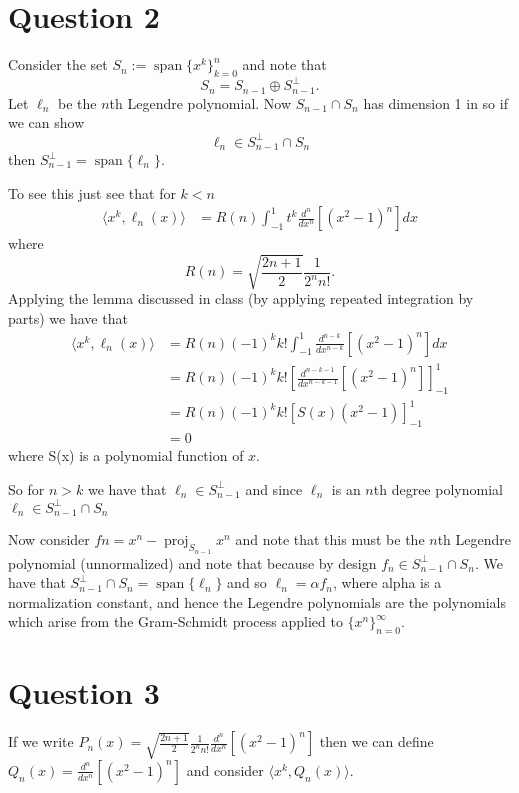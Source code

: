 \documentclass{unswmaths}
\begin{document}
\section*{Question 2}
Consider the set $ S_n := \operatorname{span} \{x^k\}^n_{k=0} $ and note that
$$ S_n = S_{n-1} \oplus S^\perp_{n-1}. $$ Let $ \ell_n $ be the $ n$th Legendre polynomial. 
Now $ S_{n-1} \cap S_n $ has dimension 1 in so if we can show 
$$ \ell_n \in S_{n-1}^\perp \cap S_n $$ 
then $ S_{n-1}^\perp = \operatorname{span} \{ \ell_n \} $.

To see this just see that for $ k < n $
\begin{align*}
	\langle x^k, \ell_n(x) \rangle 
		&= R(n) \int_{-1}^1 t^k \frac{d^n}{dx^n} \left[ (x^2 - 1)^n \right] dx
\end{align*}
where 
$$
	R(n) = \sqrt{\frac{2n+1}{2}}\frac{1}{2^n n!}. 
$$
Applying the lemma discussed in class (by applying repeated integration by parts)
we have that
\begin{align*}
	\langle x^k, \ell_n(x) \rangle 
		&= R(n) (-1)^k k! \int_{-1}^{1} \frac{d^{n-k}}{dx^{n-k}} \left[ (x^2 - 1)^n \right] dx \\
		&= R(n) (-1)^k k! \left[ \frac{d^{n-k-1}}{dx^{n-k-1}} \left[ (x^2 - 1)^n \right] \right]_{-1}^{1} \\
		&= R(n) (-1)^k k! \left[ S(x)(x^2 - 1) \right]_{-1}^{1} \\
		&= 0
\end{align*}
where S(x) is a polynomial function of $ x $. 

So for $ n > k $ we have that $ \ell_n \in S_{n-1}^\perp $ and since $ \ell_n $ is an
$ n$th degree polynomial $ \ell_n \in S_{n-1}^\perp \cap S_n $

Now consider $ f{n} = x^n - \operatorname{proj}_{S_{n-1}}x^n $ and note that this must be the
$ n$th Legendre polynomial (unnormalized) and note that because by design $ f_n \in S_{n-1}^\perp \cap S_n $.
We have that $ S_{n-1}^\perp \cap S_n = \operatorname{span} \{ \ell_{n} \} $ and so
$ \ell_n = \alpha f_n $, where alpha is a normalization constant, and hence the Legendre
polynomials are the polynomials which arise from the Gram-Schmidt process applied to
$ \{ x^n \}_{n=0}^\infty $.

\clearpage 
\section*{Question 3}
If we write $ P_n(x) =  \sqrt{\frac{2n+1}{2}} \frac{1}{2^n n!}\frac{d^n}{dx^n} \left[ (x^2 -1 )^n \right] $ then we can define
$ Q_n(x) = \frac{d^n}{dx^n}\left[ (x^2 - 1)^n \right] $ and consider $ \langle x^k, Q_n(x) \rangle $.
\end{document}
